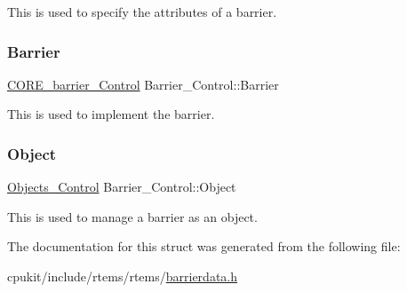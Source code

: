 This is used to specify the attributes of a barrier. \mbox{\label{structBarrier__Control_a9612e4c821f2ba3d8d9c38ea5eccead4}} 
\subsubsection{\texorpdfstring{Barrier}{Barrier}}
{\footnotesize\ttfamily \mbox{\hyperlink{structCORE__barrier__Control}{C\+O\+R\+E\+\_\+barrier\+\_\+\+Control}} Barrier\+\_\+\+Control\+::\+Barrier}

This is used to implement the barrier. \mbox{\label{structBarrier__Control_a99d3eb1c4c67348d65da23a0654b3909}} 
\subsubsection{\texorpdfstring{Object}{Object}}
{\footnotesize\ttfamily \mbox{\hyperlink{structObjects__Control}{Objects\+\_\+\+Control}} Barrier\+\_\+\+Control\+::\+Object}

This is used to manage a barrier as an object. 

The documentation for this struct was generated from the following file\+:\begin{DoxyCompactItemize}
\item 
cpukit/include/rtems/rtems/\mbox{\hyperlink{barrierdata_8h}{barrierdata.\+h}}\end{DoxyCompactItemize}
